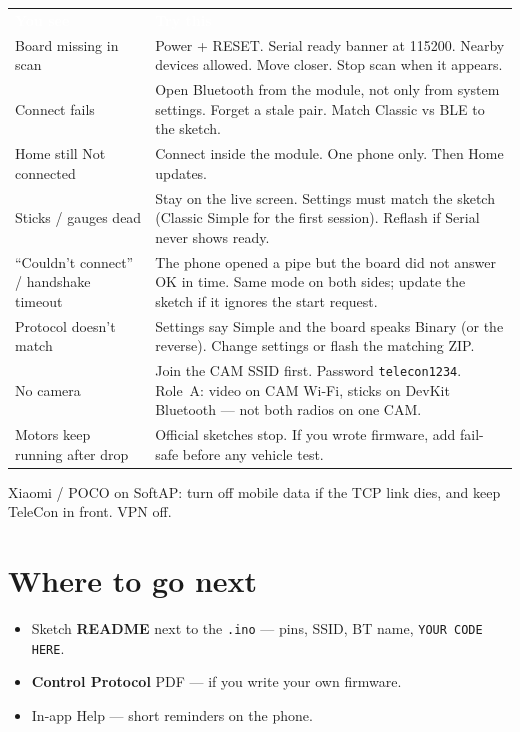 \documentclass[12pt,a4paper]{article}
\newcommand{\thc}[1]{\textcolor{white}{\bfseries #1}}
\begin{document}
\begin{center}
\renewcommand{\arraystretch}{1.2}
\begin{tabular}{>{\raggedright\arraybackslash}p{3.7cm}
                >{\raggedright\arraybackslash}p{8.5cm}}
\rowcolor{TblHead}
\thc{You see} & \thc{Try this} \\
Board missing in scan &
  Power + RESET. Serial ready banner at 115200.
  Nearby devices allowed. Move closer. Stop scan when it appears. \\
\rowcolor{TblTelem}
Connect fails &
  Open Bluetooth from the module, not only from system settings.
  Forget a stale pair. Match Classic vs BLE to the sketch. \\
Home still Not connected &
  Connect inside the module. One phone only. Then Home updates. \\
\rowcolor{TblSw}
Sticks / gauges dead &
  Stay on the live screen. Settings must match the sketch
  (Classic Simple for the first session). Reflash if Serial
  never shows ready. \\
``Couldn't connect'' /
  handshake timeout &
  The phone opened a pipe but the board did not answer OK in time.
  Same mode on both sides; update the sketch if it ignores the start
  request. \\
\rowcolor{TblId}
Protocol doesn't match &
  Settings say Simple and the board speaks Binary (or the reverse).
  Change settings or flash the matching ZIP. \\
No camera &
  Join the CAM SSID first. Password \texttt{telecon1234}.
  Role~A: video on CAM Wi-Fi, sticks on DevKit Bluetooth --- not both
  radios on one CAM. \\
\rowcolor{TblSum}
Motors keep running
  after drop &
  Official sketches stop. If you wrote firmware, add fail-safe before
  any vehicle test. \\
\end{tabular}
\end{center}

Xiaomi / POCO on SoftAP: turn off mobile data if the TCP link dies, and
keep TeleCon in front. VPN off.

\section{Where to go next}
\label{sec:next}

\begin{itemize}[leftmargin=1.4cm]
  \item Sketch \textbf{README} next to the \texttt{.ino} --- pins, SSID,
        BT name, \texttt{YOUR CODE HERE}.
  \item \textbf{Control Protocol} PDF --- if you write your own firmware.
  \item In-app Help --- short reminders on the phone.
\end{itemize}
\end{document}
